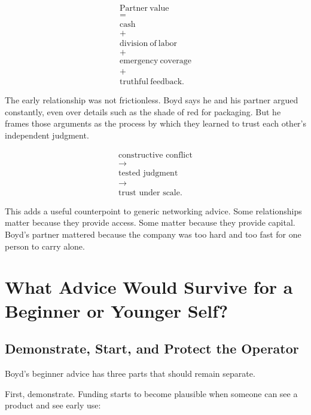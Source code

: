 \documentclass[11pt,oneside]{book}
\begin{document}
\begin{equation}
\begin{gathered}
\mathrm{Partner\ value}\\
=\\
\mathrm{cash}\\
+\\
\mathrm{division\ of\ labor}\\
+\\
\mathrm{emergency\ coverage}\\
+\\
\mathrm{truthful\ feedback}.
\end{gathered}
\end{equation}

The early relationship was not frictionless. Boyd says he and his partner argued constantly, even over details such as the shade of red for packaging. But he frames those arguments as the process by which they learned to trust each other's independent judgment.

\begin{equation}
\begin{gathered}
\text{constructive conflict}\\
\longrightarrow\\
\text{tested judgment}\\
\longrightarrow\\
\text{trust under scale}.
\end{gathered}
\end{equation}

This adds a useful counterpoint to generic networking advice. Some relationships matter because they provide access. Some matter because they provide capital. Boyd's partner mattered because the company was too hard and too fast for one person to carry alone.

\chapter{What Advice Would Survive for a Beginner or Younger Self?}

\section{Demonstrate, Start, and Protect the Operator}

Boyd's beginner advice has three parts that should remain separate.

First, demonstrate. Funding starts to become plausible when someone can see a product and see early use:
\end{document}
